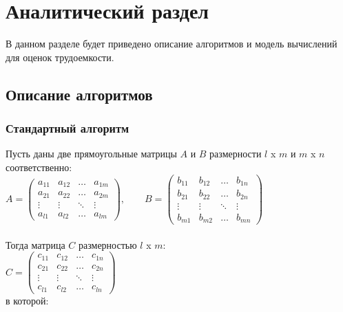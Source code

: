 \chapter{Аналитический раздел}
\label{cha:analysis}

В данном разделе будет приведено описание алгоритмов и модель
вычислений для оценок трудоемкости.

\section{Описание алгоритмов}

\subsection{Стандартный алгоритм}


Пусть даны две прямоугольные матрицы $A$ и $B$ размерности $l$ x $m$ и
$m$ x $n$ соответственно:\\

$
A = \begin{pmatrix}
    a_{11} & a_{12} & \ldots & a_{1m}\\
    a_{21} & a_{22} & \ldots & a_{2m}\\
    \vdots & \vdots & \ddots & \vdots\\
    a_{l1} & a_{l2} & \ldots & a_{lm}
\end{pmatrix},
\qquad
B = \begin{pmatrix}
    b_{11} & b_{12} & \ldots & b_{1n}\\
    b_{21} & b_{22} & \ldots & b_{2n}\\
    \vdots & \vdots & \ddots & \vdots\\
    b_{m1} & b_{m2} & \ldots & b_{mn}
\end{pmatrix}
$\\\\


Тогда матрица $C$ размерностью $l$ x $m$:\\

$
C = \begin{pmatrix}
    c_{11} & c_{12} & \ldots & c_{1n}\\
    c_{21} & c_{22} & \ldots & c_{2n}\\
    \vdots & \vdots & \ddots & \vdots\\
    c_{l1} & c_{l2} & \ldots & c_{ln}
\end{pmatrix}
$\\

в которой:

